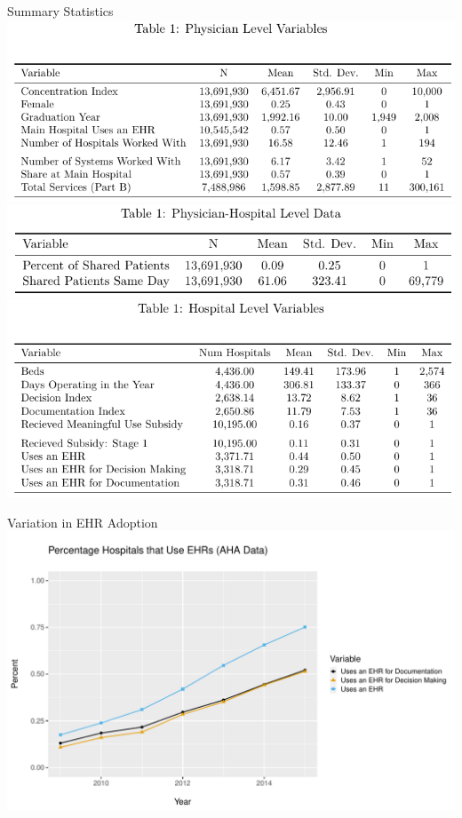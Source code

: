 \documentclass[10pt]{beamer}
\begin{document}
\begin{frame}{Summary Statistics}
\centering
\includegraphics[scale=.45]{Objects/sumstats_physician_table.pdf}\\
\vspace{5mm}
\includegraphics[scale=.45]{Objects/sumstats_pair_table.pdf}\\
\vspace{3mm}
\includegraphics[scale=.45]{Objects/sumstats_hospital_table.pdf}
\end{frame}

\begin{frame}{Variation in EHR Adoption}
\centering
\includegraphics[scale=.55]{Objects/TYP_plot_hospEHR_year.pdf}
\end{frame}
\end{document}
